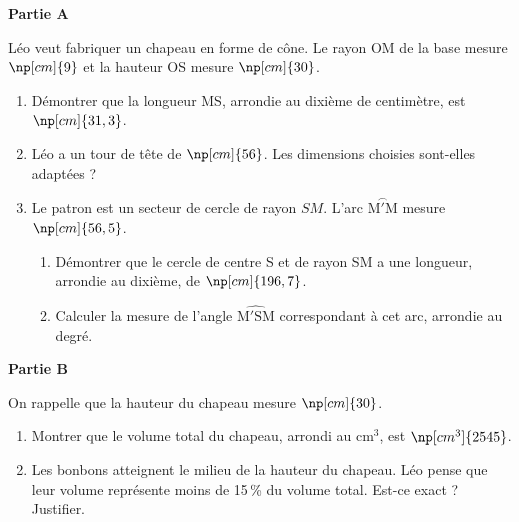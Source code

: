 \documentclass[exercice,a4]{thedocument}%
\begin{document}
%
\def\wideparen#1{\overset{\frown}{#1}}%
\textbf{Partie A}

Léo veut fabriquer un chapeau en forme de cône. Le rayon OM de la base
mesure $\np[cm]{9}$ et la hauteur OS mesure $\np[cm]{30}$.

\begin{center}
\end{center}

\begin{enumerate}
    \item Démontrer que la longueur MS, arrondie au dixième de centimètre,
    est $\np[cm]{31,3}$.
    \item Léo a un tour de tête de $\np[cm]{56}$. Les dimensions choisies
    sont-elles adaptées ?
    \item Le patron est un secteur de cercle de rayon $SM$. L'arc
    $\wideparen{\mathrm{M'M}}$ mesure $\np[cm]{56,5}$.
    \begin{enumerate}
        \item Démontrer que le cercle de centre S et de rayon SM a une
        longueur, arrondie au dixième, de $\np[cm]{196,7}$.
        \item Calculer la mesure de l'angle $\widehat{\mathrm{M'SM}}$
        correspondant à cet arc, arrondie au degré.
    \end{enumerate}
\end{enumerate}

\textbf{Partie B}

On rappelle que la hauteur du chapeau mesure $\np[cm]{30}$.
\begin{enumerate}
    \item Montrer que le volume total du chapeau, arrondi au $\mathrm{cm^3}$,
    est $\np[cm^3]{2545}$.

    \begin{center}
    \end{center}

    \item Les bonbons atteignent le milieu de la hauteur du chapeau.
    Léo pense que leur volume représente moins de 15\,\% du volume total.
    Est-ce exact ? Justifier.
\end{enumerate}
\showthesource
\end{document}
